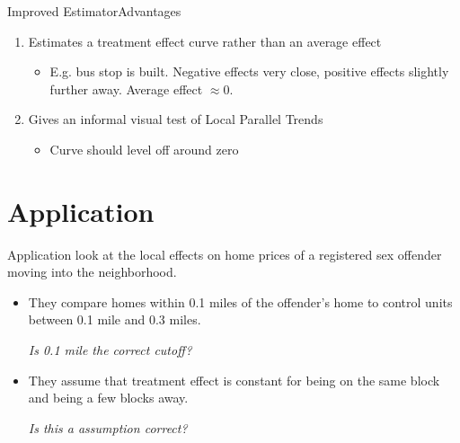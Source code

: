 \documentclass[aspectratio=43]{beamer}
\begin{document}

\begin{frame}{Improved Estimator}{Advantages}

    \begin{enumerate}
        \item Estimates a treatment effect curve rather than an average effect
        
        \begin{itemize}
            \item E.g. bus stop is built. Negative effects very close, positive effects slightly further away. Average effect $\approx 0$.
        \end{itemize}

        \pause
        \item Gives an informal visual test of {\color{asher} Local Parallel Trends}
  
        \begin{itemize}
            \item Curve should level off around zero
        \end{itemize}
    \end{enumerate}
\end{frame}

\section{Application}

\begin{frame}{Application}{\citet{Linden_Rockoff_2008}}
     look at the local effects on home prices of a registered sex offender moving into the neighborhood. 
    
    \begin{itemize}
        \item They compare homes within 0.1 miles of the offender's home to control units between 0.1 mile and 0.3 miles. 
        
        \emph{Is 0.1 mile the correct cutoff?}
        
        \item They assume that treatment effect is constant for being on the same block and being a few blocks away. 
        
        \emph{Is this a assumption correct?}
    \end{itemize}
\end{frame}
\end{document}
